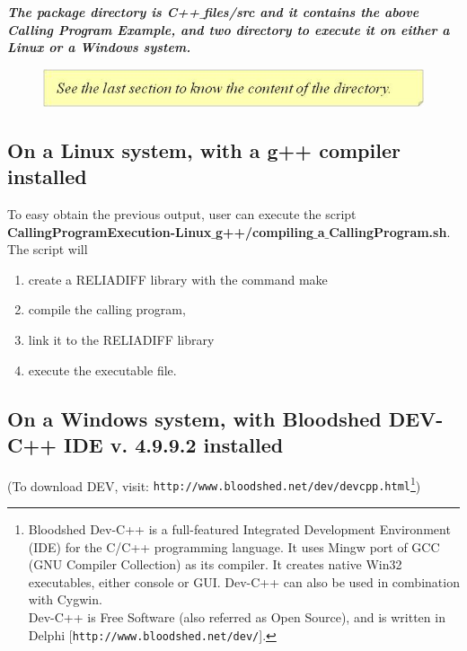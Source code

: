 \documentclass[10pt]{article}
\begin{document}
{\bf {\em The package directory is C++$\_$files/src and it contains the above Calling Program Example, and two directory to execute it on either a Linux or a Windows system.
}}

\begin{figure}[!h]
\begin{flushright}
\includegraphics[scale=0.8]{rel9}
\end{flushright}
\end{figure}

\subsection{On a Linux system, with a g++ compiler installed}


To easy obtain the previous output, user can execute the script\\
{\bf CallingProgramExecution-Linux$\_$g++/compiling$\_$a$\_$CallingProgram.sh}.\\
The script will
\begin{enumerate}
\item create a RELIADIFF library with the command make
\item compile the calling program,
\item link it to the RELIADIFF library
\item execute the executable file.
\end{enumerate}


\subsection{On a Windows system, with Bloodshed DEV-C++ IDE v. 4.9.9.2 installed}


(To download DEV, visit: {\tt  http://www.bloodshed.net/dev/devcpp.html}\footnote{Bloodshed Dev-C++ is a full-featured Integrated Development Environment (IDE) for the C/C++ programming language. It uses Mingw port of GCC (GNU Compiler Collection) as its compiler. It creates native Win32 executables, either console or GUI. Dev-C++ can also be used in combination with Cygwin.\\
Dev-C++ is Free Software (also referred as Open Source), and is written in Delphi [{\tt http://www.bloodshed.net/dev/}].})\\
\end{document}

